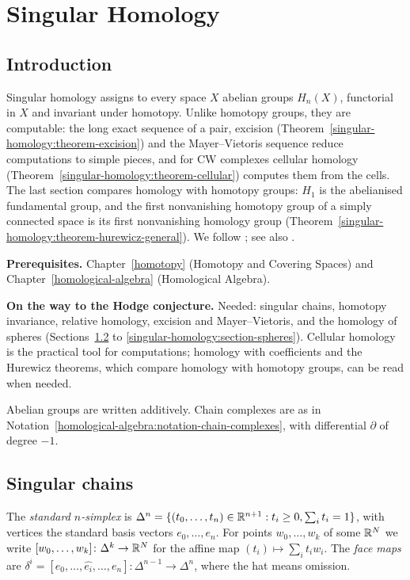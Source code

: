 \chapter{Singular Homology}\label{singular-homology}

\section{Introduction}\label{singular-homology:section-introduction}

Singular homology assigns to every space $X$ abelian groups $H_n(X)$, functorial in $X$ and invariant under homotopy. Unlike
homotopy groups, they are computable: the long exact sequence of a pair, excision
(Theorem~\ref{singular-homology:theorem-excision}) and the Mayer--Vietoris sequence reduce computations to simple pieces, and for CW
complexes cellular homology (Theorem~\ref{singular-homology:theorem-cellular}) computes them from the cells. The last section compares homology with homotopy
groups: $H_1$ is the abelianised fundamental group, and the first nonvanishing homotopy group of a simply connected space is its first nonvanishing homology group
(Theorem~\ref{singular-homology:theorem-hurewicz-general}). We follow
\cite[Chapter 2]{hatcher-at}; see also \cite{spanier-at}.

\noindent\textbf{Prerequisites.} Chapter~\ref{homotopy} (Homotopy and Covering Spaces) and Chapter~\ref{homological-algebra}
(Homological Algebra).

\noindent\textbf{On the way to the Hodge conjecture.} Needed: singular chains, homotopy invariance, relative homology, excision and Mayer--Vietoris, and the homology of spheres
(Sections~\ref{singular-homology:section-chains} to \ref{singular-homology:section-spheres}). Cellular homology is the practical tool for computations; homology with coefficients and the Hurewicz theorems, which compare homology with homotopy groups, can be read when needed.

Abelian groups are written additively. Chain complexes are as in Notation~\ref{homological-algebra:notation-chain-complexes}, with
differential $\partial$ of degree $-1$.

\section{Singular chains}\label{singular-homology:section-chains}

\begin{definition}\label{singular-homology:definition-simplex}
The \emph{standard $n$-simplex} is $\Delta^n = \{(t_0, \ldots, t_n) \in \mathbb{R}^{n+1} : t_i \geq 0, \sum_i t_i = 1\}$, with vertices the standard basis
vectors $e_0, \ldots, e_n$. For points $w_0, \ldots, w_k$ of some $\mathbb{R}^N$ we write $[w_0, \ldots, w_k] \colon \Delta^k \to \mathbb{R}^N$ for the affine map
$(t_i) \mapsto \sum_i t_iw_i$. The \emph{face maps} are $\delta^i = [e_0, \ldots, \widehat{e_i}, \ldots, e_n] \colon \Delta^{n-1} \to \Delta^n$, where the hat
means omission.
\end{definition}


